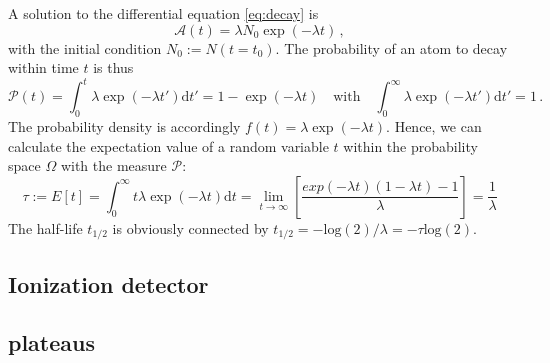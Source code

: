 A solution to the differential equation \eqref{eq:decay} is
\begin{equation}
    \mathcal{A}(t) = \lambda N_0 \exp(-\lambda t) \, ,
\end{equation}
with the initial condition $N_0 := N(t=t_0)$. 
The probability of an atom to decay within time $t$ is thus
\begin{equation}
    \mathcal{P}(t) = \int_{0}^{t}\lambda \exp(-\lambda t')\mathrm{d}t' = 1 -  \exp(-\lambda t)  \quad
    \textrm{with} \quad \int_{0}^{\infty}\lambda \exp(-\lambda t')\mathrm{d}t' = 1 \, .
\end{equation}
The probability density is accordingly $f(t) = \lambda \exp(-\lambda t)$. 
Hence, we can calculate the expectation value of a random variable $t$ within the probability space
$\Omega$ with the measure  $\mathcal{P}$:
\begin{equation}
    \tau := E[t] = \int_{0}^{\infty} t \lambda \exp(-\lambda t) \mathrm{d}t 
    =\lim_{t \rightarrow \infty}\left[ \frac{exp(-\lambda t) (1-\lambda t) - 1 }{\lambda} \right] 
= \frac{1}{\lambda}
\end{equation}
The half-life $t_{1/2}$ is obviously connected by $t_{1/2}= -\mathrm{log}(2)/ \lambda = - \tau \mathrm{log}(2)$.



\subsection{Ionization detector}
\label{subsec:detector}

\subsection{plateaus}
\label{subsec:plateaus}

